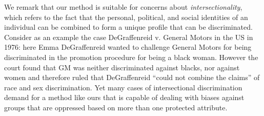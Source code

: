 %
%
%
%
%
%


We remark that our method is suitable for concerns about \emph{intersectionality}, which refers to the fact that the personal, political, and social identities of an individual can be combined to form a unique profile that can be discriminated.
%
Consider as an example the case DeGraffenreid v. General Motors in the US in 1976: here Emma DeGraffenreid wanted to challenge General Motors for being discriminated in the promotion procedure for being a black woman.
%
However the court found that GM was neither discriminated against blacks, nor against women and therefore ruled that DeGraffenreid ``could not combine the claims'' of race and sex discrimination.
%
Yet many cases of intersectional discrimination demand for a method like ours that is capable of dealing with biases against groups that are oppressed based on more than one protected attribute.

